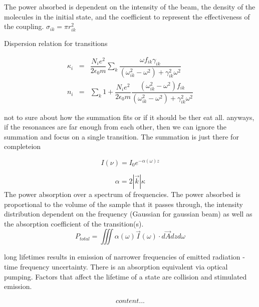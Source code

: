 \documentclass[11pt,a4paper]{book}
\begin{document}
The power absorbed is dependent on the intensity of the beam, the density of the molecules in the initial state, and the coefficient to represent the effectiveness of the coupling. $\sigma_{ik}=\pi r_{ik}^2$

Dispersion relation for transitions

\begin{eqnarray}
\kappa_i & = & \dfrac{N_i e^2}{2 \epsilon_0 m} \sum_k {
	\dfrac{\omega f_{ik}\gamma_{ik}}
	{\left(\omega_{ik}^2-\omega^2\right)+\gamma_{ik}^2\omega^2}
}\\
n_i & = & \sum_k { 1 + \dfrac{N_i e^2}{2 \epsilon_0 m} \dfrac{\left(\omega^2_{ik}-\omega^2 \right) f_{ik}}
	{\left(\omega_{ik}^2-\omega^2\right)+\gamma_{ik}^2\omega^2}
}
\end{eqnarray}

not to sure about how the summation fits or if it should be ther eat all. anyways, if the resonances are far enough from each other, then we can ignore the summation and focus on a single transition. The summation is just there for completeion

\begin{equation}
I(\nu)=I_0 e^{-\alpha(\omega)z}
\end{equation}

\begin{equation}
\alpha=2 |\vec{k}|\kappa
\end{equation}
The power absorption over a spectrum of frequencies. The power absorbed is proportional to the volume of the sample that it passes through, the intensity distribution dependent on the frequency (Gaussian for gaussian beam) as well as the absorption coefficient of the transition(s).
\begin{equation}
P_{total}=\iiint{\alpha(\omega)\vec{I}(\omega)\cdot d\vec{A} dz}d\omega
\end{equation}

long lifetimes results in emission of narrower  frequencies of emitted radiation - time frequency uncertainty. There is an absorption equivalent via optical pumping. Factors that affect the lifetime of a state are collision and stimulated emission.

\begin{equation}
content...
\end{equation}
\end{document}
